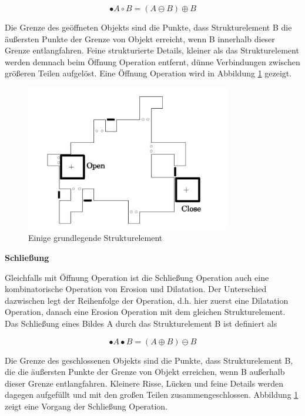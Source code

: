 \begin{equation}
•A \circ B =( A \ominus B )\oplus B  
\end{equation}

Die Grenze des geöffneten Objekts sind die Punkte, dass Strukturelement B die äußersten Punkte der Grenze von Objekt erreicht, wenn B innerhalb dieser Grenze entlangfahren. Feine strukturierte Details,
kleiner als das Strukturelement werden demnach beim Öffnung Operation entfernt, dünne Verbindungen zwischen größeren Teilen aufgelöst. Eine Öffnung Operation wird in Abbildung \ref{fig:oeffnungundschliessung} gezeigt.

\begin{figure}[htb]
 \centering 
  \includegraphics[keepaspectratio,width=0.8\textwidth]{images/4_ZweiteErfahrung/Morphological/oeffnungundschliessung.pdf}
 \caption{Einige grundlegende Strukturelement}
 \label{fig:oeffnungundschliessung}
\end{figure} 

\textbf{Schließung}

Gleichfalls mit Öffnung Operation ist die Schließung Operation auch eine kombinatorische Operation von Erosion und Dilatation. Der Unterschied dazwischen legt der Reihenfolge der Operation, d.h. hier zuerst eine Dilatation Operation, danach eine Erosion Operation mit dem gleichen Strukturelement. Das Schließung eines Bildes A durch das Strukturelement B ist definiert als

\begin{equation}
•A \bullet B =( A \oplus B )\ominus B  
\end{equation}

Die Grenze des geschlossenen Objekts sind die Punkte, dass Strukturelement B, die die äußersten Punkte der Grenze von Objekt erreichen, wenn B außerhalb dieser Grenze entlangfahren. Kleinere Risse, Lücken und feine Details werden dagegen aufgefüllt und mit den großen Teilen zusammengeschlossen. Abbildung \ref{fig:oeffnungundschliessung} zeigt eine Vorgang der Schließung Operation.


